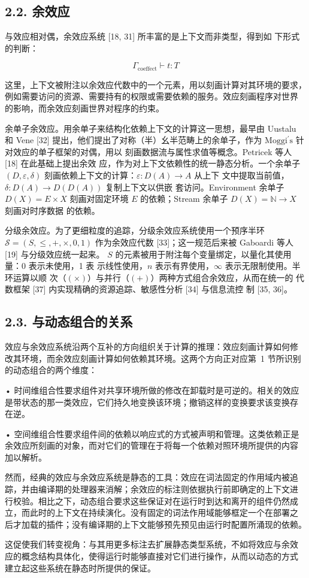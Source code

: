 \subsection{2.2. 余效应}\label{coefects}

与效应相对偶，余效应系统 {[}18, 31{]} 所丰富的是上下文而非类型，得到如
下形式的判断：

\[
\Gamma _ { \mathrm { c o e f f e c t } } \vdash t : T\tag{3}
\]

这里，上下文被附注以余效应代数中的一个元素，用以刻画计算对其环境的要求，
例如需要访问的资源、需要持有的权限或需要依赖的服务。效应刻画程序对世界
的影响，而余效应刻画世界对程序的约束。

余单子余效应。用余单子来结构化依赖上下文的计算这一思想，最早由 Uustalu
和 Vene {[}32{]} 提出，他们提出了对称（半）幺半范畴上的余单子，作为
\(\mathrm { M o g g i ^ { \prime } s }\) 针对效应的单子框架的对偶，用以
刻画数据流与属性求值等概念。Petricek 等人 {[}18{]} 在此基础上提出余效
应，作为对上下文依赖性的统一静态分析。一个余单子 \(( D , \varepsilon ,
\delta )\) 刻画依赖上下文的计算：\(\varepsilon : D ( A ) \to A\) 从上下
文中提取当前值，\(\delta : D ( A ) \to D ( D ( A ) )\) 复制上下文以供嵌
套访问。Environment 余单子 \(D ( X ) = E \times X\) 刻画对固定环境 \(E\)
的依赖；Stream 余单子 \(D ( X ) = \mathbb { N } \to X\) 刻画对时序数据
的依赖。

分级余效应。为了更细粒度的追踪，分级余效应系统使用一个预序半环
\(\mathcal{S} = ( S , \leq , + , \times , 0 , 1 )\) 作为余效应代数
{[}33{]}；这一规范后来被 Gaboardi 等人 {[}19{]} 与分级效应统一起来。
\(S\) 的元素被用于附注每个变量绑定，以量化其使用量：0 表示未使用，1 表
示线性使用，\(n\) 表示有界使用，\(\infty\) 表示无限制使用。半环运算以顺
次（\(( \times )\)）与并行（\(( + )\)）两种方式组合余效应，从而在统一的
代数框架 {[}37{]} 内实现精确的资源追踪、敏感性分析 {[}34{]} 与信息流控
制 {[}35, 36{]}。

\subsection{2.3. 与动态组合的关系}\label{relationship-to-dynamic-composability}

效应与余效应系统沿两个互补的方向组织关于计算的推理：效应刻画计算如何修
改其环境，而余效应刻画计算如何依赖其环境。这两个方向正对应第~1 节所识别
的动态组合的两个维度：

• 时间维组合性要求组件对共享环境所做的修改在卸载时是可逆的。相关的效应
是带状态的那一类效应，它们持久地变换该环境；撤销这样的变换要求该变换存
在逆。

• 空间维组合性要求组件间的依赖以响应式的方式被声明和管理。这类依赖正是
余效应所刻画的对象，而对它们的管理在于将每一个依赖对照环境所提供的内容
加以解析。

然而，经典的效应与余效应系统是静态的工具：效应在词法固定的作用域内被追
踪，并由编译期的处理器来消解；余效应的标注则依据执行前即确定的上下文进
行校验。相比之下，动态组合要求这些保证对在运行时到达和离开的组件仍然成
立，而此时的上下文在持续演化。没有固定的词法作用域能够框定一个在部署之
后才加载的插件；没有编译期的上下文能够预先预见由运行时配置所涌现的依赖。

这促使我们转变视角：与其用更多标注去扩展静态类型系统，不如将效应与余效
应的概念结构具体化，使得运行时能够直接对它们进行操作，从而以动态的方式
建立起这些系统在静态时所提供的保证。
